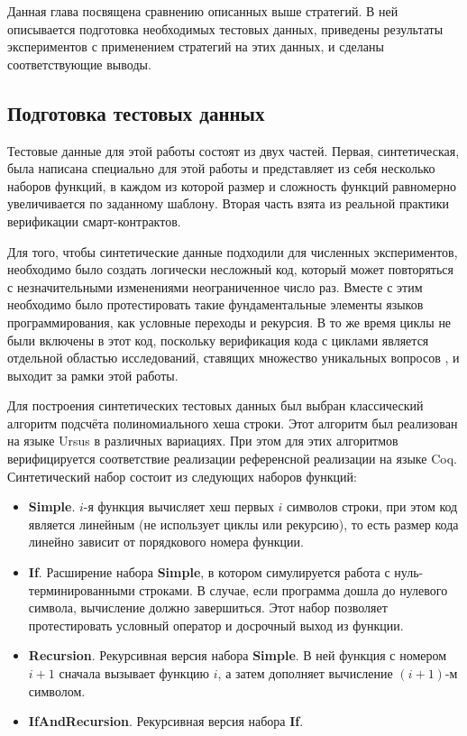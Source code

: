 \documentclass[../thesis.tex]{subfiles}
\begin{document}
\label{sec:3}

Данная глава посвящена сравнению описанных выше стратегий. В ней описывается подготовка необходимых тестовых данных, приведены результаты экспериментов с применением стратегий на этих данных, и сделаны соответствующие выводы.

\subsection{Подготовка тестовых данных}\label{dataset}

Тестовые данные для этой работы состоят из двух частей. Первая, синтетическая, была написана специально для этой работы и представляет из себя несколько наборов функций, в каждом из которой размер и сложность функций равномерно увеличивается по заданному шаблону. Вторая часть взята из реальной практики верификации смарт-контрактов.

Для того, чтобы синтетические данные подходили для численных экспериментов, необходимо было создать логически несложный код, который может повторяться с незначительными изменениями неограниченное число раз. Вместе с этим необходимо было протестировать такие фундаментальные элементы языков программирования, как условные переходы и рекурсия. В то же время циклы не были включены в этот код, поскольку верификация кода с циклами является отдельной областью исследований, ставящих множество уникальных вопросов \cite{loops_are_hard}, и выходит за рамки этой работы.

Для построения синтетических тестовых данных был выбран классический алгоритм подсчёта полиномиального хеша строки. Этот алгоритм был реализован на языке Ursus в различных вариациях. При этом для этих алгоритмов верифицируется соответствие реализации референсной реализации на языке Coq. Синтетический набор состоит из следующих наборов функций:

\begin{itemize}
    \item \textbf{Simple}. $i$-я функция вычисляет хеш первых $i$ символов строки, при этом код является линейным (не использует циклы или рекурсию), то есть размер кода линейно зависит от порядкового номера функции.
    \item \textbf{If}. Расширение набора \textbf{Simple}, в котором симулируется работа с нуль-\\ терминированными строками. В случае, если программа дошла до нулевого символа, вычисление должно завершиться. Этот набор позволяет протестировать условный оператор и досрочный выход из функции.
    \item \textbf{Recursion}. Рекурсивная версия набора \textbf{Simple}. В ней функция с номером $i+1$ сначала вызывает функцию $i$, а затем дополняет вычисление $(i+1)$-м символом.
    \item \textbf{IfAndRecursion}. Рекурсивная версия набора \textbf{If}.
\end{itemize}
\end{document}
